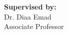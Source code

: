 \begin{titlepage}
\vspace{1.0cm}

\begin{center}
    {\Large\bfseries Supervised by:}\\[0.3cm]
    {\Large\color{asuBlue} Dr. Diaa Emad}\\[0.1cm]
    {\small Associate Professor}
\end{center}

\vfill

\end{titlepage}
